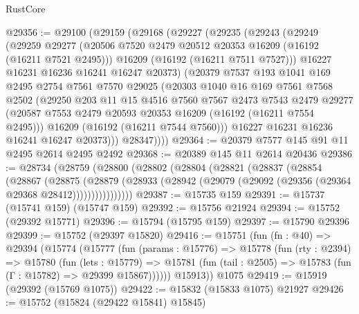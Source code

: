 \begin{lexlean}{RustCore}
\begin{coremodule}
@29356 := @29100
    (@29159
      (@29168
        (@29227
          (@29235
            (@29243
              (@29249
                (@29259
                  @29277
                  (@20506 @7520 @2479 @20512 @20353 @16209 (@16192 (@16211 @7521 @2495)))
                  @16209
                  (@16192 (@16211 @7511 @7527)))
                @16227
                @16231
                @16236
                @16241
                @16247
                @20373)
              (@20379
                @7537
                @193
                @1041
                @169
                @2495
                @2754
                @7561
                @7570
                @29025
                (@20303
                  @1040
                  @16
                  @169
                  @7561
                  @7568
                  @2502
                  (@29250
                    @203
                    @11
                    @15
                    @4516
                    @7560
                    @7567
                    @2473
                    @7543
                    @2479
                    @29277
                    (@20587 @7553 @2479 @20593 @20353 @16209 (@16192 (@16211 @7554 @2495)))
                    @16209
                    (@16192 (@16211 @7544 @7560)))
                  @16227
                  @16231
                  @16236
                  @16241
                  @16247
                  @20373)))
            @28347))))
@29364 := @20379 @7577 @145 @91 @11 @2495 @2614 @2495 @2492
@29368 := @20389 @145 @11 @2614 @20436
@29386 := @28734
    (@28759
      (@28800
        (@28802
          (@28804
            (@28821
              (@28837
                (@28854
                  (@28867
                    (@28875
                      (@28879
                        (@28933
                          (@28942 (@29079 (@29092 (@29356 (@29364 @29368 @28412))))))))))))))))
@29387 := @15735 @159
@29391 := @15737 (@15741 @159) (@15747 @159)
@29392 := @15756 @21924
@29394 := @15752 (@29392 @15771)
@29396 := @15794 (@15795 @159)
@29397 := @15790 @29396
@29399 := @15752 (@29397 @15820)
@29416 := @15751
    (fun (fn : @40) =>
    @29394
      (@15774
        (@15777
          (fun (params : @15776) =>
          @15778
            (fun (rty : @2394) =>
            @15780
              (fun (lets : @15779) =>
              @15781 (fun (tail : @2505) => @15783 (fun (Γ : @15782) => @29399 @15867))))))
        @15913))
    @1075
@29419 := @15919 (@29392 (@15769 @1075))
@29422 := @15832 (@15833 @1075) @21927
@29426 := @15752 (@15824 (@29422 @15841) @15845)

\end{coremodule}
\end{lexlean}
